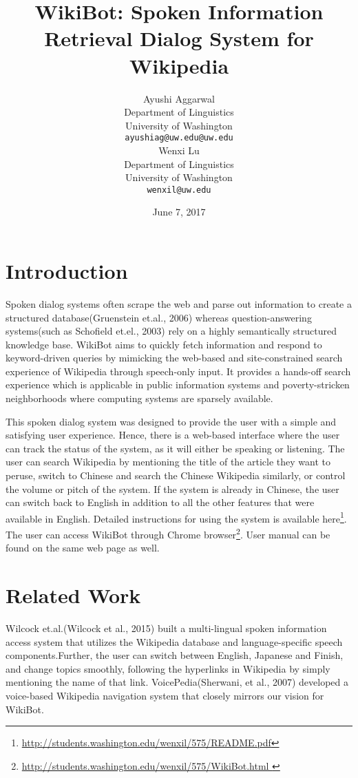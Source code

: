 \documentclass[11pt,a4paper]{article}
\title{WikiBot: Spoken Information Retrieval Dialog System for Wikipedia}
\author{Ayushi Aggarwal\\
  Department of Linguistics \\
  University of Washington \\
  {\tt ayushiag@uw.edu@uw.edu} \\\And
  Wenxi Lu \\
  Department of Linguistics \\
  University of Washington \\
  {\tt wenxil@uw.edu} \\}
\date{June 7, 2017}
\begin{document}
\maketitle

\section{Introduction}
Spoken dialog systems often scrape the web and parse out information to create a structured database(Gruenstein et.al., 2006) whereas question-answering systems(such as Schofield et.el., 2003) rely on a highly semantically structured knowledge base. WikiBot aims to quickly fetch information and respond to keyword-driven queries by mimicking the web-based and site-constrained search experience of Wikipedia through speech-only input.
It provides a hands-off search experience which is applicable in public information systems and poverty-stricken neighborhoods where computing systems are sparsely available. 

This spoken dialog system was designed to provide the user with a simple and satisfying user experience. Hence, there is a web-based interface where the user can track the status of the system, as it will either be speaking or listening. The user can search Wikipedia by mentioning the title of the article they want to peruse, switch to Chinese and search the Chinese Wikipedia similarly, or control the volume or pitch of the system. If the system is already in Chinese, the user can switch back to English in addition to all the other features that were available in English. Detailed instructions for using the system is available here\footnote{\url{http://students.washington.edu/wenxil/575/README.pdf}}. The user can access WikiBot through Chrome browser\footnote{\url{http://students.washington.edu/wenxil/575/WikiBot.html
}}. User manual can be found on the same web page as well.

\section{Related Work}
Wilcock et.al.(Wilcock et al., 2015) built a multi-lingual spoken information access system that utilizes the Wikipedia database and language-specific speech components.Further, the user can switch between English, Japanese and Finish, and change topics smoothly, following the hyperlinks in Wikipedia by simply mentioning the name of that link.  
VoicePedia(Sherwani, et al., 2007) developed a voice-based Wikipedia navigation system that closely mirrors our vision for WikiBot.
\end{document}
